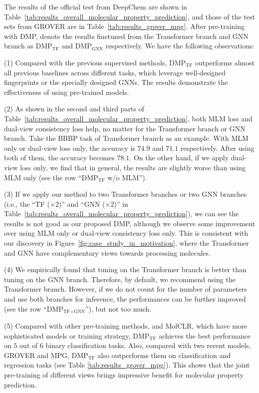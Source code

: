 \documentclass{article}
\newcommand{\ourM}{DMP}
\newcommand{\ourMTF}{DMP$_\textrm{TF}$}
\newcommand{\ourMGNN}{DMP$_\textrm{GNN}$}
\begin{document}
The results of the official test from DeepChem are shown in Table~\ref{tab:results_overall_molecular_property_prediction}, and those of the test sets from GROVER \cite{rong2020self} are in Table~\ref{tab:results_grover_mpg}. After pre-training with \ourM{}, denote the results finetuned from the Transformer branch and GNN branch as \ourMTF{} and \ourMGNN{} respectively. We have the following observations:


\noindent(1) Compared with the previous supervised methods, \ourMTF{} outperforms almost all previous baselines across different tasks, which leverage well-designed fingerprints or the specially designed GNNs. The results demonstrate  the effectiveness of using pre-trained models.


\noindent(2)  As shown in the second and third parts of Table~\ref{tab:results_overall_molecular_property_prediction}, both MLM loss and dual-view consistency loss help, no matter for the Transformer branch or GNN branch. Take the BBBP task of Transformer branch as an example. With MLM only or dual-view loss only, the accuracy is $74.9$ and $71.1$ respectively. After using both of them, the accuracy becomes $78.1$. On the other hand, if we apply dual-view loss only, we find that in general, the results are slightly worse than using MLM only (see the row ``\ourMTF{} w/o MLM'').

\noindent(3) If we apply our method to two Transformer branches or two GNN branches (i.e., the ``TF ($\times2$)'' and ``GNN ($\times2$)'' in Table~\ref{tab:results_overall_molecular_property_prediction}), we can see the results is not good as our proposed \ourM{}, although we observe some improvement over using MLM only or dual-view consistency loss only. This is consistent with our discovery in Figure~\ref{fig:case_study_in_motivation}, where the Transformer and GNN have complementary views towards processing molecules.

\noindent(4) We empirically found that tuning on the Transformer branch is better than tuning on the GNN branch. Therefore, by default, we recommend using the Transformer branch. However, if we do not count for the number of parameters and use both branches for inference, the performances can be further improved (see the row ``\ourM{}$_\textrm{TF+GNN}$''), but not too much.

\noindent(5) Compared with other pre-training methods, \citet{hu2019strategies} and MolCLR, which have more sophisticated models or training strategy, \ourMTF{} achieves the best performance on $5$ out of $6$ binary classification tasks. Also, compared with two recent models, GROVER and MPG,  \ourMTF{} also outperforms them on  classification and regression tasks (see Table \ref{tab:results_grover_mpg}). This shows that the joint pre-training of different views brings impressive benefit for molecular property prediction.
\end{document}
